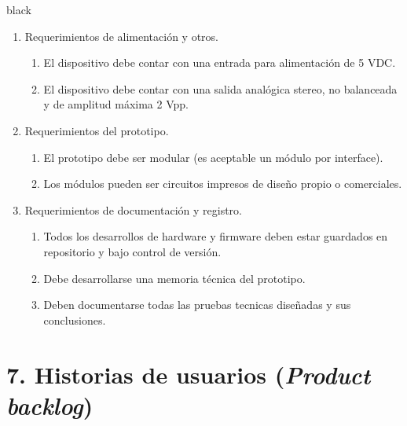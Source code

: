 \documentclass[
11pt, %
codirector, %
]{charter}
\begin{document}
\begin{consigna}{black}
\begin{enumerate}
\begin{enumerate}
		\end{enumerate}
	\item Requerimientos de alimentación y otros.
		\begin{enumerate}
			\item El dispositivo debe contar con una entrada para alimentación de 5 VDC.
			\item El dispositivo debe contar con una salida analógica stereo, no balanceada y de amplitud máxima 2 Vpp.
		\end{enumerate}
	\item Requerimientos del prototipo.
		\begin{enumerate}
			\item El prototipo debe ser modular (es aceptable un módulo por interface).
			\item Los módulos pueden ser circuitos impresos de diseño propio o comerciales.
		\end{enumerate}
	\item Requerimientos de documentación y registro.
		\begin{enumerate}
			\item Todos los desarrollos de hardware y firmware deben estar guardados en repositorio y bajo control de versión.
			\item Debe desarrollarse una memoria técnica del prototipo.
			\item Deben documentarse todas las pruebas tecnicas diseñadas y sus conclusiones. 
		\end{enumerate}	
\end{enumerate}

\end{consigna}

\section{7. Historias de usuarios (\textit{Product backlog})}
\label{sec:backlog}
\end{document}
